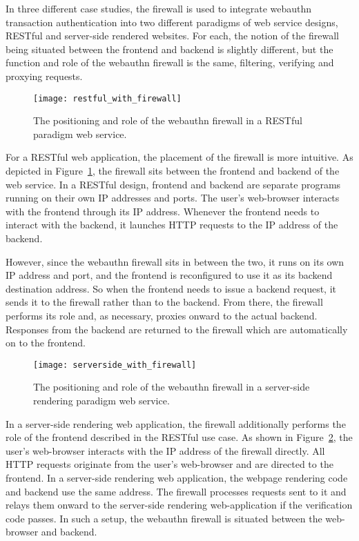 In three different case studies, the firewall is used to integrate webauthn transaction authentication into two different paradigms of web service designs, RESTful and server-side rendered websites. For each, the notion of the firewall being situated between the frontend and backend is slightly different, but the function and role of the webauthn firewall is the same, filtering, verifying and proxying requests. 

\begin{figure}[h]
  \centering
  \texttt{[image: restful\_with\_firewall]}
  \caption{The positioning and role of the webauthn firewall in a RESTful paradigm web service.}\label{Fig:ProxyingRequestsRESTful}
\end{figure}

For a RESTful web application, the placement of the firewall is more intuitive. As depicted in Figure~\ref{Fig:ProxyingRequestsRESTful}, the firewall sits between the frontend and backend of the web service. In a RESTful design, frontend and backend are separate programs running on their own IP addresses and ports. The user's web-browser interacts with the frontend through its IP address. Whenever the frontend needs to interact with the backend, it launches HTTP requests to the IP address of the backend. 

However, since the webauthn firewall sits in between the two, it runs on its own IP address and port, and the frontend is reconfigured to use it as its backend destination address. So when the frontend needs to issue a backend request, it sends it to the firewall rather than to the backend. From there, the firewall performs its role and, as necessary, proxies onward to the actual backend. Responses from the backend are returned to the firewall which are automatically on to the frontend. 

\begin{figure}[h]
  \centering
  \texttt{[image: serverside\_with\_firewall]}
  \caption{The positioning and role of the webauthn firewall in a server-side rendering paradigm web service.}\label{Fig:ProxyingRequestsServerSide}
\end{figure}

In a server-side rendering web application, the firewall additionally performs the role of the frontend described in the RESTful use case. As shown in Figure~\ref{Fig:ProxyingRequestsServerSide}, the user's web-browser interacts with the IP address of the firewall directly. All HTTP requests originate from the user's web-browser and are directed to the frontend. In a server-side rendering web application, the webpage rendering code and backend use the same address. The firewall processes requests sent to it and relays them onward to the server-side rendering web-application if the verification code passes. In such a setup, the webauthn firewall is situated between the web-browser and backend.

